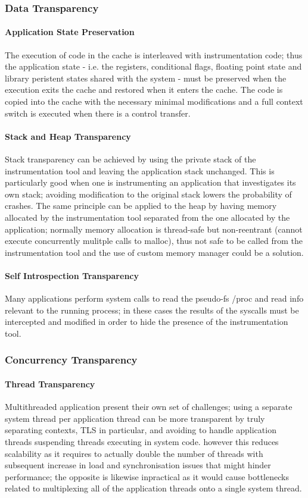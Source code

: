 \subsubsection{Data Transparency}
\paragraph{Application State Preservation} The execution of code in the cache is interleaved with instrumentation code;
thus the application state - i.e. the registers, conditional flags, floating point state and library peristent states
shared with the system - must be preserved when the execution exits the cache and restored when it enters the cache. The
code is copied into the cache with the necessary minimal modifications and a full context switch is executed when there
is a control transfer.
\paragraph{Stack and Heap Transparency} Stack transparency can be achieved by using the private stack of the
instrumentation tool and leaving the application stack unchanged. This is particularly good when one is instrumenting
an application that investigates its own stack; avoiding modification to the original stack lowers the probability of
crashes. The same principle can be applied to the heap by having memory allocated by the instrumentation tool separated
from the one allocated by the application; normally memory allocation is thread-safe but non-reentrant (cannot execute
concurrently mulitple calls to {\ttfamily malloc}), thus not safe to be called from the instrumentation tool and the use
of custom memory manager could be a solution.
\paragraph{Self Introspection Transparency} Many applications perform system calls to read the pseudo-fs {\ttfamily
/proc} and read info relevant to the running process; in these cases the results of the syscalls must be intercepted and
modified in order to hide the presence of the instrumentation tool.

\subsubsection{Concurrency Transparency}
\paragraph{Thread Transparency} Multithreaded application present their own set of challenges; using a separate system
thread per application thread can be more transparent by truly separating contexts, TLS in particular, and avoiding to
handle application threads suspending threads executing in system code. however this reduces scalability as it requires
to actually double the number of threads with subsequent increase in load and synchronisation issues that might hinder
performance; the opposite is likewise inpractical as it would cause bottlenecks related to multiplexing all of the
application threads onto a single system thread.
